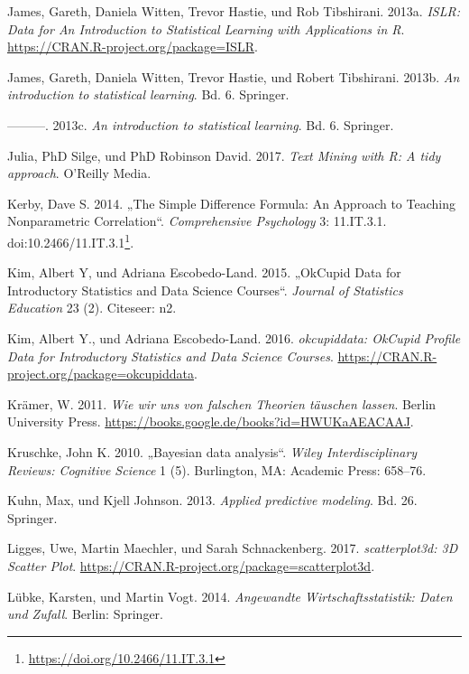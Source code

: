 \documentclass[12pt,ngerman,]{book}
\let\rmarkdownfootnote\footnote%
\def\footnote{\protect\rmarkdownfootnote}
\renewcommand{\href}[2]{#2\footnote{\url{#1}}}
\theoremstyle{definition}
\theoremstyle{definition}
\theoremstyle{remark}
\begin{document}
\hypertarget{ref-R-ISLR}{}
James, Gareth, Daniela Witten, Trevor Hastie, und Rob Tibshirani. 2013a.
\emph{ISLR: Data for An Introduction to Statistical Learning with
Applications in R}. \url{https://CRAN.R-project.org/package=ISLR}.

\hypertarget{ref-introstatlearning}{}
James, Gareth, Daniela Witten, Trevor Hastie, und Robert Tibshirani.
2013b. \emph{An introduction to statistical learning}. Bd. 6. Springer.

\hypertarget{ref-james2013introduction}{}
---------. 2013c. \emph{An introduction to statistical learning}. Bd. 6.
Springer.

\hypertarget{ref-tidytextminig}{}
Julia, PhD Silge, und PhD Robinson David. 2017. \emph{Text Mining with
R: A tidy approach}. O'Reilly Media.

\hypertarget{ref-Kerby2014}{}
Kerby, Dave S. 2014. „The Simple Difference Formula: An Approach to
Teaching Nonparametric Correlation``. \emph{Comprehensive Psychology} 3:
11.IT.3.1.
doi:\href{https://doi.org/10.2466/11.IT.3.1}{10.2466/11.IT.3.1}.

\hypertarget{ref-kim2015okcupid}{}
Kim, Albert Y, und Adriana Escobedo-Land. 2015. „OkCupid Data for
Introductory Statistics and Data Science Courses``. \emph{Journal of
Statistics Education} 23 (2). Citeseer: n2.

\hypertarget{ref-R-okcupiddata}{}
Kim, Albert Y., und Adriana Escobedo-Land. 2016. \emph{okcupiddata:
OkCupid Profile Data for Introductory Statistics and Data Science
Courses}. \url{https://CRAN.R-project.org/package=okcupiddata}.

\hypertarget{ref-kraemer2011wir}{}
Krämer, W. 2011. \emph{Wie wir uns von falschen Theorien täuschen
lassen}. Berlin University Press.
\url{https://books.google.de/books?id=HWUKaAEACAAJ}.

\hypertarget{ref-kruschke2010bayesian}{}
Kruschke, John K. 2010. „Bayesian data analysis``. \emph{Wiley
Interdisciplinary Reviews: Cognitive Science} 1 (5). Burlington, MA:
Academic Press: 658--76.

\hypertarget{ref-kuhn2013applied}{}
Kuhn, Max, und Kjell Johnson. 2013. \emph{Applied predictive modeling}.
Bd. 26. Springer.

\hypertarget{ref-R-scatterplot3d}{}
Ligges, Uwe, Martin Maechler, und Sarah Schnackenberg. 2017.
\emph{scatterplot3d: 3D Scatter Plot}.
\url{https://CRAN.R-project.org/package=scatterplot3d}.

\hypertarget{ref-lubke2014angewandte}{}
Lübke, Karsten, und Martin Vogt. 2014. \emph{Angewandte
Wirtschaftsstatistik: Daten und Zufall}. Berlin: Springer.
\end{document}
